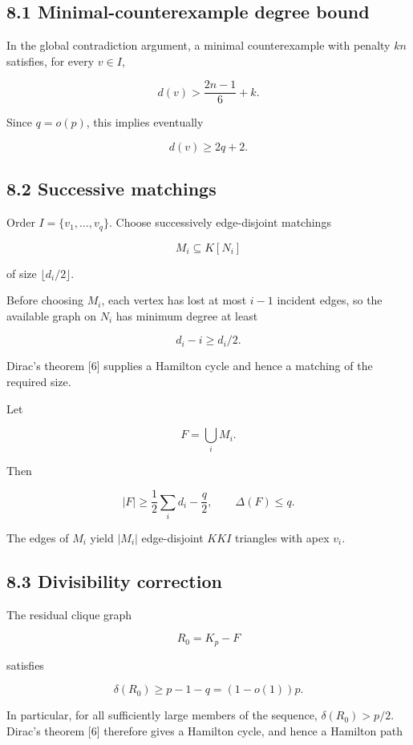 \documentclass[
  american,
  11pt,
  a4paper,
]{article}
\begin{document}
\subsection{8.1 Minimal-counterexample degree bound}\label{minimal-counterexample-degree-bound}

In the global contradiction argument, a minimal counterexample with penalty \(kn\) satisfies, for every \(v\in I\),

\[
d(v)>
\frac{2n-1}{6}+k.
\tag{8.1}
\]

Since \(q=o(p)\), this implies eventually

\[
d(v)\ge2q+2.
\tag{8.2}
\]

\subsection{8.2 Successive matchings}\label{successive-matchings}

Order \(I=\{v_1,\ldots,v_q\}\). Choose successively edge-disjoint matchings

\[
M_i\subseteq K[N_i]
\]

of size \(\lfloor d_i/2\rfloor\).

Before choosing \(M_i\), each vertex has lost at most \(i-1\) incident edges, so the available graph on \(N_i\) has minimum degree at least

\[
d_i-i\ge d_i/2.
\]

Dirac's theorem {[}6{]} supplies a Hamilton cycle and hence a matching of the required size.

Let

\[
F=\bigcup_iM_i.
\]

Then

\[
|F|
\ge
\frac12\sum_i d_i-\frac q2,
\qquad
\Delta(F)\le q.
\tag{8.3}
\]

The edges of \(M_i\) yield \(|M_i|\) edge-disjoint \(KKI\) triangles with apex \(v_i\).

\subsection{8.3 Divisibility correction}\label{divisibility-correction}

The residual clique graph

\[
R_0=K_p-F
\]

satisfies

\[
\delta(R_0)
\ge
p-1-q
=(1-o(1))p.
\tag{8.4}
\]

In particular, for all sufficiently large members of the sequence, \(\delta(R_0)>p/2\). Dirac's theorem {[}6{]} therefore gives a Hamilton cycle, and hence a Hamilton path
\end{document}
